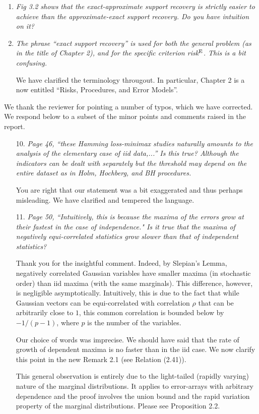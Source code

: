 \documentclass[11pt]{article}
\begin{document}
\begin{enumerate}
\item  {\em Fig 3.2 shows that the exact-approximate support recovery is strictly easier to achieve than the approximate-exact support recovery. 
Do you have intuition on it?}


\item {\em The phrase ``exact support recovery''  is used for both the general problem
(as in the title of Chapter 2), and for the specific criterion risk$^{\rm E}$. This is a bit confusing.}

We have clarified the terminology througout.  In particular, Chapter 2 is a now entitled ``Risks, Procedures, and Error Models''.
   
    \end{enumerate}

We thank the reviewer for pointing a number of typos, which we have corrected.  We respond below to a subset of the minor points
and comments raised in the report.

\medskip
{}
\begin{itemize}
 \item [10.] {\em Page 46, ``these Hamming loss-minimax studies naturally amounts to the analysis of the elementary case of iid data,...'' 
 Is this true? Although the indicators can be dealt with separately but the threshold may depend on the entire dataset as in Holm, 
 Hochberg, and BH procedures. }
 
 You are right that our statement was a bit exaggerated and thus perhaps misleading. We have clarified and tempered the language.
 
 \item[11.]{\em Page 50, ``Intuitively, this is because the maxima of the errors grow at their fastest in the case of independence." Is it true that the maxima of negatively equi-correlated statistics grow slower than that of independent statistics?}
 
  Thank you for the insightful comment.  Indeed, by Slepian's Lemma, negatively correlated Gaussian variables have smaller maxima (in stochastic order)
  than iid maxima (with the same marginals).  This difference, however, is negligible asymptotically.  Intuitively, this is due to the fact that while Gaussian
  vectors can be equi-correlated with correlation $\rho$ that can be arbitrarily close to $1$, this common correlation is bounded below by $-1/(p-1)$,
  where $p$ is the number of the variables. 
  
  Our choice of words was imprecise. We should have said that the rate of growth of dependent maxima is no faster than in the iid case.  
  We now clarify this point in the new Remark 2.1 (see Relation (2.41)). 
  
  This general observation is entirely due to the light-tailed (rapidly varying) nature of the marginal distributions.  It applies to error-arrays with arbitrary
  dependence and the proof involves the union bound and the rapid variation property of the marginal distributions.  Please see Proposition 2.2.
   
 
\end{itemize}
\end{document}
